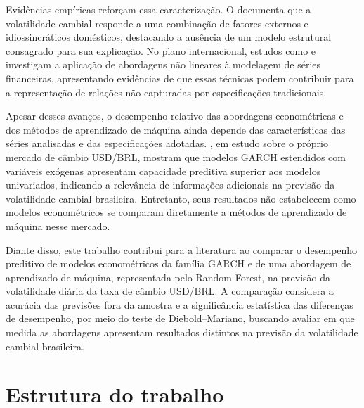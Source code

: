 Evidências empíricas reforçam essa caracterização. O \textcite{bacen2021volatilidade} documenta que a volatilidade cambial responde a uma combinação de fatores externos e idiossincráticos 
domésticos, destacando a ausência de um modelo estrutural consagrado para sua explicação. No plano internacional, estudos como \textcite{donaldson1997neural} e \textcite{kristjanpoller2015gold} 
investigam a aplicação de abordagens não lineares à modelagem de séries financeiras, apresentando evidências de que essas técnicas podem contribuir para a representação de relações não capturadas 
por especificações tradicionais.

Apesar desses avanços, o desempenho relativo das abordagens econométricas e dos métodos de aprendizado de máquina ainda depende das características das séries analisadas e das especificações adotadas. 
\textcite{campani2018forecasting}, em estudo sobre o próprio mercado de câmbio USD/BRL, mostram que modelos GARCH estendidos com variáveis exógenas apresentam capacidade preditiva superior aos modelos 
univariados, indicando a relevância de informações adicionais na previsão da volatilidade cambial brasileira. Entretanto, seus resultados não estabelecem como modelos econométricos se comparam diretamente 
a métodos de aprendizado de máquina nesse mercado.

Diante disso, este trabalho contribui para a literatura ao comparar o desempenho preditivo de modelos econométricos da família GARCH e de uma abordagem de aprendizado de máquina, representada pelo Random 
Forest, na previsão da volatilidade diária da taxa de câmbio USD/BRL. A comparação considera a acurácia das previsões fora da amostra e a significância estatística das diferenças de desempenho, por meio do 
teste de Diebold–Mariano, buscando avaliar em que medida as abordagens apresentam resultados distintos na previsão da volatilidade cambial brasileira.

\section{Estrutura do trabalho}

